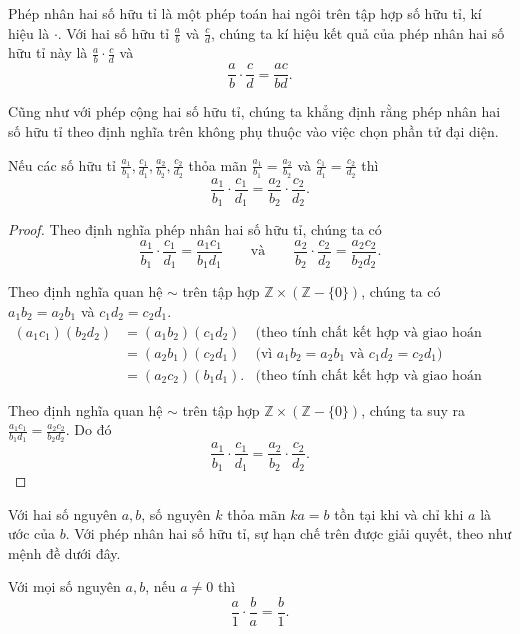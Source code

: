 \begin{definition}
	Phép nhân hai số hữu tỉ là một phép toán hai ngôi trên tập hợp số hữu tỉ, kí hiệu là $\cdot$. Với hai số hữu tỉ $\frac{a}{b}$ và $\frac{c}{d}$, chúng ta kí hiệu kết quả của phép nhân hai số hữu tỉ này là $\frac{a}{b}\cdot\frac{c}{d}$ và
	\[
		\frac{a}{b}\cdot\frac{c}{d} = \frac{ac}{bd}.
	\]
\end{definition}

Cũng như với phép cộng hai số hữu tỉ, chúng ta khẳng định rằng phép nhân hai số hữu tỉ theo định nghĩa trên không phụ thuộc vào việc chọn phần tử đại diện.
\begin{proposition}
	Nếu các số hữu tỉ $\frac{a_{1}}{b_{1}}, \frac{c_{1}}{d_{1}}, \frac{a_{2}}{b_{2}}, \frac{c_{2}}{d_{2}}$ thỏa mãn $\frac{a_{1}}{b_{1}} = \frac{a_{2}}{b_{2}}$ và $\frac{c_{1}}{d_{1}} = \frac{c_{2}}{d_{2}}$ thì
	\[
		\frac{a_{1}}{b_{1}}\cdot\frac{c_{1}}{d_{1}} = \frac{a_{2}}{b_{2}}\cdot\frac{c_{2}}{d_{2}}.
	\]
\end{proposition}

\begin{proof}
	Theo định nghĩa phép nhân hai số hữu tỉ, chúng ta có
	\[
		\frac{a_{1}}{b_{1}}\cdot\frac{c_{1}}{d_{1}} = \frac{a_{1}c_{1}}{b_{1}d_{1}}\qquad\text{và}\qquad\frac{a_{2}}{b_{2}}\cdot\frac{c_{2}}{d_{2}} = \frac{a_{2}c_{2}}{b_{2}d_{2}}.
	\]

	Theo định nghĩa quan hệ $\sim$ trên tập hợp $\mathbb{Z}\times(\mathbb{Z} - \{0\})$, chúng ta có $a_{1}b_{2} = a_{2}b_{1}$ và $c_{1}d_{2} = c_{2}d_{1}$.
	\begin{align*}
		(a_{1}c_{1})(b_{2}d_{2}) & = (a_{1}b_{2})(c_{1}d_{2})  & \text{(theo tính chất kết hợp và giao hoán của phép nhân số nguyên)} \\
		                         & = (a_{2}b_{1})(c_{2}d_{1})  & \text{(vì $a_{1}b_{2} = a_{2}b_{1}$ và $c_{1}d_{2} = c_{2}d_{1}$)}   \\
		                         & = (a_{2}c_{2})(b_{1}d_{1}). & \text{(theo tính chất kết hợp và giao hoán của phép nhân số nguyên)}
	\end{align*}

	Theo định nghĩa quan hệ $\sim$ trên tập hợp $\mathbb{Z}\times(\mathbb{Z} - \{0\})$, chúng ta suy ra $\frac{a_{1}c_{1}}{b_{1}d_{1}} = \frac{a_{2}c_{2}}{b_{2}d_{2}}$. Do đó
	\[
		\frac{a_{1}}{b_{1}}\cdot\frac{c_{1}}{d_{1}} = \frac{a_{2}}{b_{2}}\cdot\frac{c_{2}}{d_{2}}.
	\]
\end{proof}

Với hai số nguyên $a, b$, số nguyên $k$ thỏa mãn $ka = b$ tồn tại khi và chỉ khi $a$ là ước của $b$. Với phép nhân hai số hữu tỉ, sự hạn chế trên được giải quyết, theo như mệnh đề dưới đây.
\begin{proposition}
	Với mọi số nguyên $a, b$, nếu $a\ne 0$ thì
	\[
		\frac{a}{1}\cdot\frac{b}{a} = \frac{b}{1}.
	\]
\end{proposition}

